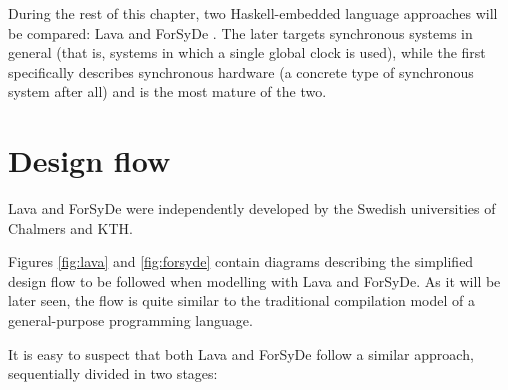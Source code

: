   During the rest of this chapter, two Haskell-embedded language
  approaches will be compared: Lava \cite{lava} and
  ForSyDe \cite{forsyde}. The later targets synchronous systems in
  general (that is, systems in which a single global clock is
  used\footnotemark {}), while the first specifically describes
  synchronous hardware (a concrete type of synchronous system after
  all) and is the most mature of the two.
  
\section{Design flow}
Lava and ForSyDe were independently developed by the Swedish
universities of Chalmers and KTH.

Figures \ref{fig:lava} and \ref{fig:forsyde} contain diagrams
describing the simplified design flow to be followed when modelling with
Lava and ForSyDe.  As it will be later seen, the flow is quite
similar to the traditional compilation model of a
general-purpose programming language.

It is easy to suspect that both Lava and ForSyDe follow a similar
approach, sequentially divided in two stages:


